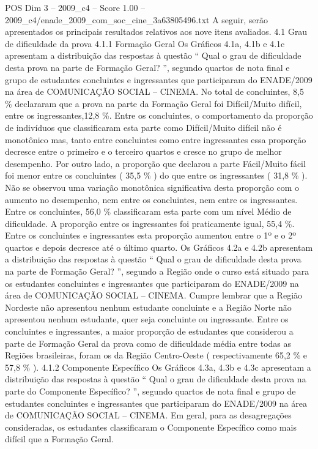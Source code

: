 \begin{textsample}{POS Dim 3 – 2009\_c4 – Score 1.00 – 2009\_c4/enade\_2009\_com\_soc\_cine\_3a63805496.txt}
A seguir, serão apresentados os principais resultados relativos aos nove itens avaliados. 4.1 Grau de dificuldade da prova 4.1.1 Formação Geral Os Gráficos 4.1a, 4.1b e 4.1c apresentam a distribuição das respostas à questão “ Qual o grau de dificuldade desta prova na parte de Formação Geral? ”, segundo quartos de nota final e grupo de estudantes concluintes e ingressantes que participaram do ENADE/2009 na área de COMUNICAÇÃO SOCIAL – CINEMA.
No total de concluintes, 8,5 \% declararam que a prova na parte da Formação Geral foi Difícil/Muito difícil, entre os ingressantes,12,8 \%.
Entre os concluintes, o comportamento da proporção de indivíduos que classificaram esta parte como Difícil/Muito difícil não é monotônico mas, tanto entre concluintes como entre ingressantes essa proporção decresce entre o primeiro e o terceiro quartos e cresce no grupo de melhor desempenho.
Por outro lado, a proporção que declarou a parte Fácil/Muito fácil foi menor entre os concluintes ( 35,5 \% ) do que entre os ingressantes ( 31,8 \% ).
Não se observou uma variação monotônica significativa desta proporção com o aumento no desempenho, nem entre os concluintes, nem entre os ingressantes.
Entre os concluintes, 56,0 \% classificaram esta parte com um nível Médio de dificuldade.
A proporção entre os ingressantes foi praticamente igual, 55,4 \%.
Entre os concluintes e ingressantes esta proporção aumentou entre o 1º e o 2º quartos e depois decresce até o último quarto.
Os Gráficos 4.2a e 4.2b apresentam a distribuição das respostas à questão “ Qual o grau de dificuldade desta prova na parte de Formação Geral? ”, segundo a Região onde o curso está situado para os estudantes concluintes e ingressantes que participaram do ENADE/2009 na área de COMUNICAÇÃO SOCIAL – CINEMA.
Cumpre lembrar que a Região Nordeste não apresentou nenhum estudante concluinte e a Região Norte não apresentou nenhum estudante, quer seja concluinte ou ingressante.
Entre os concluintes e ingressantes, a maior proporção de estudantes que considerou a parte de Formação Geral da prova como de dificuldade média entre todas as Regiões brasileiras, foram os da Região Centro-Oeste ( respectivamente 65,2 \% e 57,8 \% ). 4.1.2 Componente Específico Os Gráficos 4.3a, 4.3b e 4.3c apresentam a distribuição das respostas à questão “ Qual o grau de dificuldade desta prova na parte do Componente Específico? ”, segundo quartos de nota final e grupo de estudantes concluintes e ingressantes que participaram do ENADE/2009 na área de COMUNICAÇÃO SOCIAL – CINEMA.
Em geral, para as desagregações consideradas, os estudantes classificaram o Componente Específico como mais difícil que a Formação Geral.

\end{textsample}
